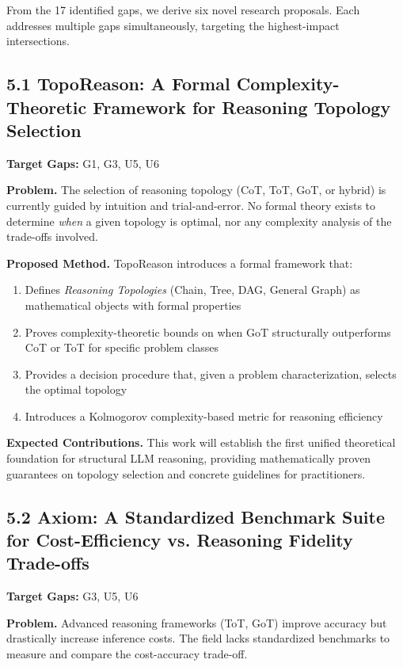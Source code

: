 \documentclass[11pt,a4paper]{article}
\begin{document}
From the 17 identified gaps, we derive six novel research proposals. Each addresses multiple gaps simultaneously, targeting the highest-impact intersections.

\subsection{5.1 TopoReason: A Formal Complexity-Theoretic Framework for Reasoning Topology Selection}

\textbf{Target Gaps:} G1, G3, U5, U6

\textbf{Problem.} The selection of reasoning topology (CoT, ToT, GoT, or hybrid) is currently guided by intuition and trial-and-error. No formal theory exists to determine \textit{when} a given topology is optimal, nor any complexity analysis of the trade-offs involved.

\textbf{Proposed Method.} TopoReason introduces a formal framework that:
\begin{enumerate}
  \item Defines \textit{Reasoning Topologies} (Chain, Tree, DAG, General Graph) as mathematical objects with formal properties
  \item Proves complexity-theoretic bounds on when GoT structurally outperforms CoT or ToT for specific problem classes
  \item Provides a decision procedure that, given a problem characterization, selects the optimal topology
  \item Introduces a Kolmogorov complexity-based metric for reasoning efficiency
\end{enumerate}

\textbf{Expected Contributions.} This work will establish the first unified theoretical foundation for structural LLM reasoning, providing mathematically proven guarantees on topology selection and concrete guidelines for practitioners.

\subsection{5.2 Axiom: A Standardized Benchmark Suite for Cost-Efficiency vs. Reasoning Fidelity Trade-offs}

\textbf{Target Gaps:} G3, U5, U6

\textbf{Problem.} Advanced reasoning frameworks (ToT, GoT) improve accuracy but drastically increase inference costs. The field lacks standardized benchmarks to measure and compare the cost-accuracy trade-off.
\end{document}
